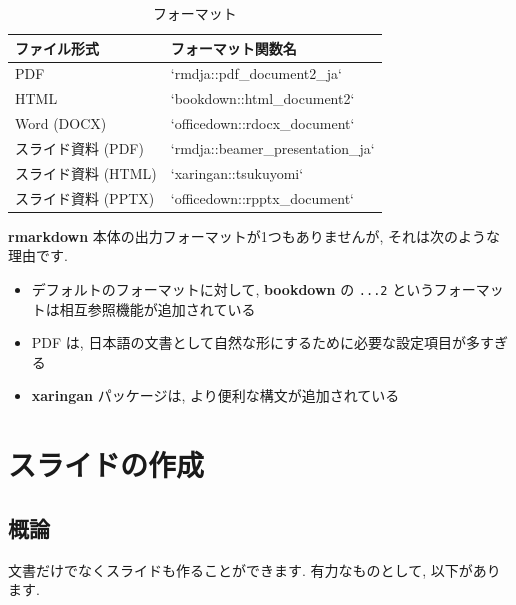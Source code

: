 \documentclass[
]{bxjsarticle}
\providecommand{\tightlist}{%
  \setlength{\itemsep}{0pt}\setlength{\parskip}{0pt}}
\begin{document}
\begin{table}

\caption{\label{tab:format-tab}フォーマット}
\centering
\begin{tabular}[t]{ll}
\toprule
ファイル形式 & フォーマット関数名\\
\midrule
PDF & `rmdja::pdf\_document2\_ja`\\
HTML & `bookdown::html\_document2`\\
Word (DOCX) & `officedown::rdocx\_document`\\
スライド資料 (PDF) & `rmdja::beamer\_presentation\_ja`\\
スライド資料 (HTML) & `xaringan::tsukuyomi`\\
\addlinespace
スライド資料 (PPTX) & `officedown::rpptx\_document`\\
\bottomrule
\end{tabular}
\end{table}

\textbf{rmarkdown} 本体の出力フォーマットが1つもありませんが, それは次のような理由です.

\begin{itemize}
\tightlist
\item
  デフォルトのフォーマットに対して, \textbf{bookdown} の \texttt{...2} というフォーマットは相互参照機能が追加されている
\item
  PDF は, 日本語の文書として自然な形にするために必要な設定項目が多すぎる
\item
  \textbf{xaringan} パッケージは, より便利な構文が追加されている
\end{itemize}

\hypertarget{ux30b9ux30e9ux30a4ux30c9ux306eux4f5cux6210}{%
\section{スライドの作成}\label{ux30b9ux30e9ux30a4ux30c9ux306eux4f5cux6210}}

\hypertarget{ux6982ux8ad6}{%
\subsection{概論}\label{ux6982ux8ad6}}

文書だけでなくスライドも作ることができます. 有力なものとして, 以下があります.
\end{document}
